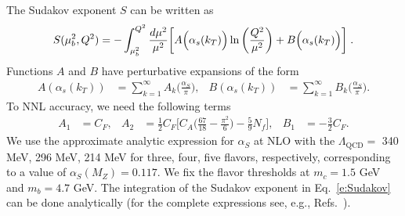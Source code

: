 \documentclass[aps,preprintnumbers,showpacs,nofootinbib,superscriptaddress,floatfix]{revtex4}
\newcommand{\bT}{\zeta_T}
\begin{document}
The Sudakov exponent $S$ 
can be written as
\begin{equation} 
S(\mu_b^2,Q^2)=-\int_{\mu_b^2}^{Q^2}{d\mu^2\over \mu^2}
\bigg[A\Big(\alpha_s(k_T)\Big)\ln\bigg({Q^2\over \mu^2}\bigg) 
+ B\Big(\alpha_s(k_T)\Big) \bigg] \;.
\label{e:Sudakov} 
\end{equation} 
Functions $A$ and $B$ have perturbative expansions of the form
\begin{align}
A\left(\alpha_s(k_T)\right) &= \sum_{k=1}^{\infty}A_k
\bigg(\frac{\alpha_S}{\pi} \bigg),
&
B\left(\alpha_s(k_T)\right) &= \sum_{k=1}^{\infty}B_k
\bigg(\frac{\alpha_S}{\pi} \bigg).
\end{align} 
To NNL accuracy, we need the following 
terms \cite{Davies:1984hs,Collins:1984kg}
\begin{align}
A_1&= C_F, 
&
A_2&=
\frac{1}{2} C_F  \bigg[
C_A \bigg( \frac{67}{18} - \frac{\pi^2}{6} \bigg)
- \frac{5}{9} N_f \bigg],
&
B_1&= - \frac{3}{2}C_F.
\end{align} 
We use the approximate analytic expression for $\alpha_S$ at NLO with the
$\Lambda_{\text{QCD}}=$ 340 MeV, 296 MeV, 214 MeV for three, four, five
flavors, respectively, corresponding to a value of $\alpha_S(M_Z)=0.117$. 
We fix the flavor thresholds at $m_c=1.5$ GeV and 
$m_b= 4.7$ GeV. The integration of the Sudakov exponent in
Eq.~\eqref{e:Sudakov} can
be done analytically (for the complete expressions see, e.g.,
Refs.~\cite{Frixione:1998dw,Bozzi:2005wk,Echevarria:2012pw}).  


\end{document}
